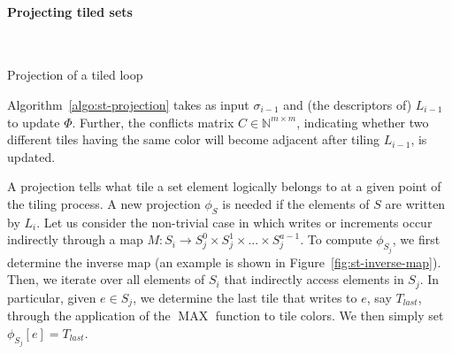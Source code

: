 \paragraph{Projecting tiled sets}

\begin{algorithm}[t]
\nonl ~\\
\caption{Projection of a tiled loop}
\label{algo:st-projection}
\end{algorithm}

Algorithm~\ref{algo:st-projection} takes as input $\sigma_{i-1}$ and (the descriptors of) $L_{i-1}$ to update $\Phi$. Further, the conflicts matrix $C \in \mathbb{N}^{m \times m}$, indicating whether two different tiles having the same color will become adjacent after tiling $L_{i-1}$, is updated. 

A projection tells what tile a set element logically belongs to at a given point of the tiling process. A new projection $\phi_{S}$ is needed if the elements of $S$ are written by $L_i$. Let us consider the non-trivial case in which writes or increments occur indirectly through a map $M : S_i \rightarrow S_j^0 \times S_j^1 \times ... \times S_j^{a-1}$. To compute $\phi_{S_{j}}$, we first determine the inverse map (an example is shown in Figure~\ref{fig:st-inverse-map}). Then, we iterate over all elements of $S_i$ that indirectly access elements in $S_j$. In particular, given $e \in S_j$, we determine the last tile that writes to $e$, say $T_{last}$, through the application of the $\operatorname{MAX}$ function to tile colors. We then simply set $\phi_{S_{j}}[e] = T_{last}$. 



